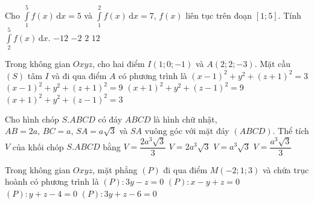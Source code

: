 \begin{ex}%
	Cho $\displaystyle\int\limits_{1}^5 f(x)\mathrm{\,d}x=5$ và $\displaystyle\int\limits_{1}^2 f(x)\mathrm{\,d}x=7$, $f(x)$ liên tục trên đoạn $[1;5]$. Tính $\displaystyle\int\limits_{2}^5 f(x)\mathrm{\,d}x$.
	\choice 
	{$-12$}
	{$-2$}
	{\True $2$}
	{$12$}
\end{ex} 

\begin{ex}%
	Trong không gian $Oxyz$, cho hai điểm $I(1;0;-1)$ và $A(2;2;-3)$. Mặt cầu $(S)$ tâm $I$ và đi qua điểm $A$ có phương trình là
	\choice 
	{$(x-1)^2+y^2+(z+1)^2=3$}
	{\True $(x-1)^2+y^2+(z+1)^2=9$} 
	{$(x+1)^2+y^2+(z-1)^2=9$}
	{$(x+1)^2+y^2+(z-1)^2=3$}
\end{ex}

\begin{ex}%
	Cho hình chóp $S.ABCD$ có đáy $ABCD$ là hình chữ nhật, $AB=2a,\,BC=a,\,SA=a\sqrt{3}$ và $SA$ vuông góc với mặt đáy $(ABCD)$. Thể tích $V$ của khối chóp $S.ABCD$ bằng
	\choice 
	{\True $V=\dfrac{2a^3\sqrt{3}}{3}$}
	{$V=2a^3\sqrt{3}$}
	{$V=a^3\sqrt{3}$}
	{$V=\dfrac{a^3\sqrt{3}}{3}$}
\end{ex} 

\begin{ex}%
	Trong không gian $Oxyz$, mặt phẳng $(P)$ đi qua điểm $M(-2; 1; 3)$ và chứa trục hoành có phương trình là
	\choice 
	{\True $(P)\colon 3y-z=0$}
	{$(P)\colon x-y+z=0$}
	{$(P)\colon y+z-4=0$}
	{$(P)\colon 3y+z-6=0$}
\end{ex} 

